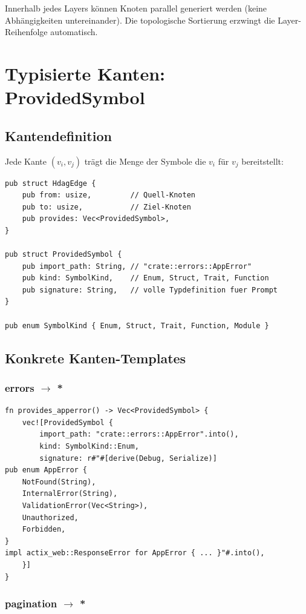 \documentclass[11pt,a4paper]{article}
\begin{document}
Innerhalb jedes Layers können Knoten parallel generiert werden
(keine Abhängigkeiten untereinander). Die topologische Sortierung
erzwingt die Layer-Reihenfolge automatisch.

\section{Typisierte Kanten: ProvidedSymbol}

\subsection{Kantendefinition}

Jede Kante $(v_i, v_j)$ trägt die Menge der Symbole die $v_i$
für $v_j$ bereitstellt:

\begin{lstlisting}
pub struct HdagEdge {
    pub from: usize,         // Quell-Knoten
    pub to: usize,           // Ziel-Knoten
    pub provides: Vec<ProvidedSymbol>,
}

pub struct ProvidedSymbol {
    pub import_path: String, // "crate::errors::AppError"
    pub kind: SymbolKind,    // Enum, Struct, Trait, Function
    pub signature: String,   // volle Typdefinition fuer Prompt
}

pub enum SymbolKind { Enum, Struct, Trait, Function, Module }
\end{lstlisting}

\subsection{Konkrete Kanten-Templates}

\subsubsection{errors $\to$ *}

\begin{lstlisting}
fn provides_apperror() -> Vec<ProvidedSymbol> {
    vec![ProvidedSymbol {
        import_path: "crate::errors::AppError".into(),
        kind: SymbolKind::Enum,
        signature: r#"#[derive(Debug, Serialize)]
pub enum AppError {
    NotFound(String),
    InternalError(String),
    ValidationError(Vec<String>),
    Unauthorized,
    Forbidden,
}
impl actix_web::ResponseError for AppError { ... }"#.into(),
    }]
}
\end{lstlisting}

\subsubsection{pagination $\to$ *}
\end{document}
